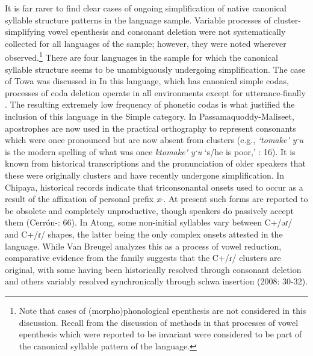   It is far rarer to find clear cases of ongoing simplification of native canonical syllable structure patterns in the language sample. Variable processes of cluster-simplifying vowel epenthesis and consonant deletion were not systematically collected for all languages of the sample; however, they were noted wherever observed.\footnote{ \textrm{Note that cases of (morpho)phonological epenthesis are not considered in this discussion. Recall from the discussion of methods in  that processes of vowel epenthesis which were reported to be invariant were considered to be part of the canonical syllable pattern of the language.}} There are four languages in the sample for which the canonical syllable structure seems to be unambiguously undergoing simplification. The case of Towa was discussed in  In this language, which has canonical simple codas, processes of coda deletion operate in all environments except for utterance-finally \citep[22-4]{Yumitani1998}. The resulting extremely low frequency of phonetic codas is what justified the inclusion of this language in the Simple category. In Passamaquoddy-Maliseet, apostrophes are now used in the practical orthography to represent consonants which were once pronounced but are now absent from clusters (e.g., \textit{‘tomake\'{} yˑu} is the modern spelling of what was once \textit{ktomake\'{} yˑu} ‘s/he is poor,’ \citealt{Leavitt1996}: 16). It is known from historical transcriptions and the pronunciation of older speakers that these were originally clusters and have recently undergone simplification. In Chipaya, historical records indicate that triconsonantal onsets used to occur as a result of the affixation of personal prefix \textit{x-}. At present such forms are reported to be obsolete and completely unproductive, though speakers do passively accept them (Cerrón-\citealt{Palomino2006}: 66). In Atong, some non-initial syllables vary between C+/əɾ/ and C+/ɾ/ shapes, the latter being the only complex onsets attested in the language. While Van Breugel analyzes this as a process of vowel reduction, comparative evidence from the family suggests that the C+/ɾ/ clusters are original, with some having been historically resolved through consonant deletion and others variably resolved synchronically through schwa insertion (2008: 30-32).



